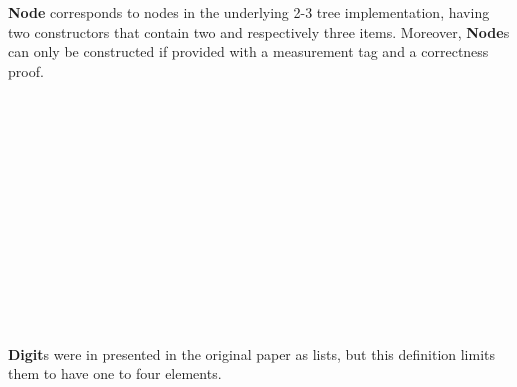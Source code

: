 \documentclass[12pt,twoside,notitlepage]{report}
\begin{document}
\textbf{Node} corresponds to nodes in the underlying 2-3 tree implementation, having two constructors that contain two and respectively three items. Moreover, \textbf{Node}s can only be constructed if provided with a measurement tag and a correctness proof.
  
\begin{code}
\\
\>  \AgdaSymbol{\{}\AgdaSymbol{\}} \AgdaSymbol{(} \AgdaSymbol{:}  \AgdaSymbol{)(} \AgdaSymbol{:}   \AgdaSymbol{)}\<%
\\
\>[0]\<[10]%
\>[10]  \AgdaSymbol{:}   \<%
\\
\>[0]\<[10]%
\>[10]  \AgdaSymbol{:}     \AgdaSymbol{:}   \<%
\\
\>[0]\<[2]%
\>[2] \AgdaSymbol{:} \AgdaSymbol{(} \AgdaSymbol{:} \AgdaSymbol{)}\<%
\\
\>[2]\<[8]%
\>[8] \AgdaSymbol{(} \AgdaSymbol{:} \AgdaSymbol{)}  \AgdaSymbol{(} \AgdaSymbol{:} \AgdaSymbol{)}\<%
\\
\>[2]\<[8]%
\>[8] \<[11]%
\>[11]\AgdaSymbol{(}        \AgdaSymbol{)}\<%
\\
\>[2]\<[8]%
\>[8]   \<%
\\
\>[0]\<[2]%
\>[2] \AgdaSymbol{:} \AgdaSymbol{(} \AgdaSymbol{:} \AgdaSymbol{)}\<%
\\
\>[2]\<[8]%
\>[8] \AgdaSymbol{(} \AgdaSymbol{:} \AgdaSymbol{)}  \AgdaSymbol{(} \AgdaSymbol{:} \AgdaSymbol{)}  \AgdaSymbol{(} \AgdaSymbol{:} \AgdaSymbol{)}\<%
\\
\>[2]\<[8]%
\>[8] \AgdaSymbol{(}            \AgdaSymbol{)}\<%
\\
\>[2]\<[8]%
\>[8]   \<%
\\
\end{code}
\textbf{Digit}s were in presented in the original paper as lists, but this definition limits them to have one to four elements.
\end{document}

